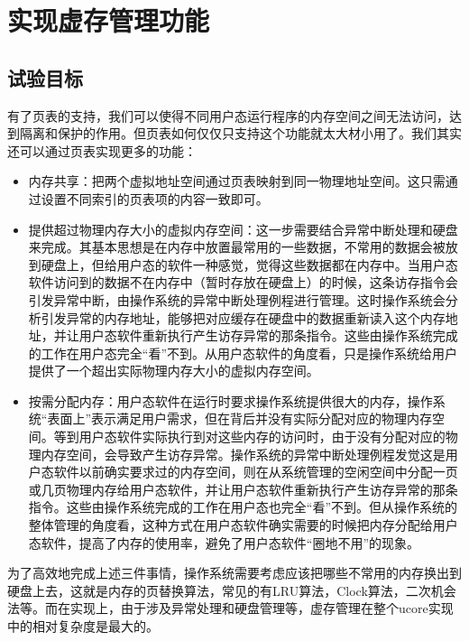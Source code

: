 \section{实现虚存管理功能}\label{ux5b9eux73b0ux865aux5b58ux7ba1ux7406ux529fux80fd}

\subsection{试验目标}\label{ux8bd5ux9a8cux76eeux6807}

有了页表的支持，我们可以使得不同用户态运行程序的内存空间之间无法访问，达到隔离和保护的作用。但页表如何仅仅只支持这个功能就太大材小用了。我们其实还可以通过页表实现更多的功能：

\begin{itemize}
\item
  内存共享：把两个虚拟地址空间通过页表映射到同一物理地址空间。这只需通过设置不同索引的页表项的内容一致即可。
\item
  提供超过物理内存大小的虚拟内存空间：这一步需要结合异常中断处理和硬盘来完成。其基本思想是在内存中放置最常用的一些数据，不常用的数据会被放到硬盘上，但给用户态的软件一种感觉，觉得这些数据都在内存中。当用户态软件访问到的数据不在内存中（暂时存放在硬盘上）的时候，这条访存指令会引发异常中断，由操作系统的异常中断处理例程进行管理。这时操作系统会分析引发异常的内存地址，能够把对应缓存在硬盘中的数据重新读入这个内存地址，并让用户态软件重新执行产生访存异常的那条指令。这些由操作系统完成的工作在用户态完全``看''不到。从用户态软件的角度看，只是操作系统给用户提供了一个超出实际物理内存大小的虚拟内存空间。
\item
  按需分配内存：用户态软件在运行时要求操作系统提供很大的内存，操作系统``表面上''表示满足用户需求，但在背后并没有实际分配对应的物理内存空间。等到用户态软件实际执行到对这些内存的访问时，由于没有分配对应的物理内存空间，会导致产生访存异常。操作系统的异常中断处理例程发觉这是用户态软件以前确实要求过的内存空间，则在从系统管理的空闲空间中分配一页或几页物理内存给用户态软件，并让用户态软件重新执行产生访存异常的那条指令。这些由操作系统完成的工作在用户态也完全``看''不到。但从操作系统的整体管理的角度看，这种方式在用户态软件确实需要的时候把内存分配给用户态软件，提高了内存的使用率，避免了用户态软件``圈地不用''的现象。
\end{itemize}

为了高效地完成上述三件事情，操作系统需要考虑应该把哪些不常用的内存换出到硬盘上去，这就是内存的页替换算法，常见的有LRU算法，Clock算法，二次机会法等。而在实现上，由于涉及异常处理和硬盘管理等，虚存管理在整个ucore实现中的相对复杂度是最大的。

